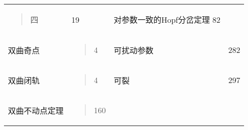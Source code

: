 \begin{longtable}[]{@{}llll@{}}
\begin{minipage}[t]{0.22\columnwidth}
\begin{quote}
四
\end{quote}\strut
\end{minipage} & \begin{minipage}[t]{0.22\columnwidth}\raggedright
19\strut
\end{minipage} & \begin{minipage}[t]{0.22\columnwidth}\raggedright
对参数一致的Hopf分岔定理 82\strut
\end{minipage} & \begin{minipage}[t]{0.22\columnwidth}\raggedright
\strut
\end{minipage}\tabularnewline
\begin{minipage}[t]{0.22\columnwidth}\raggedright
双曲奇点\strut
\end{minipage} & \begin{minipage}[t]{0.22\columnwidth}\raggedright
\begin{quote}
4
\end{quote}\strut
\end{minipage} & \begin{minipage}[t]{0.22\columnwidth}\raggedright
可扰动参数\strut
\end{minipage} & \begin{minipage}[t]{0.22\columnwidth}\raggedright
282\strut
\end{minipage}\tabularnewline
\begin{minipage}[t]{0.22\columnwidth}\raggedright
双曲闭轨\strut
\end{minipage} & \begin{minipage}[t]{0.22\columnwidth}\raggedright
\begin{quote}
4
\end{quote}\strut
\end{minipage} & \begin{minipage}[t]{0.22\columnwidth}\raggedright
可裂\strut
\end{minipage} & \begin{minipage}[t]{0.22\columnwidth}\raggedright
297\strut
\end{minipage}\tabularnewline
\begin{minipage}[t]{0.22\columnwidth}\raggedright
双曲不动点定理\strut
\end{minipage} & \begin{minipage}[t]{0.22\columnwidth}\raggedright
\begin{quote}
160
\end{quote}\strut
\end{minipage} & \begin{minipage}[t]{0.22\columnwidth}\raggedright

\end{minipage}
\end{longtable}
